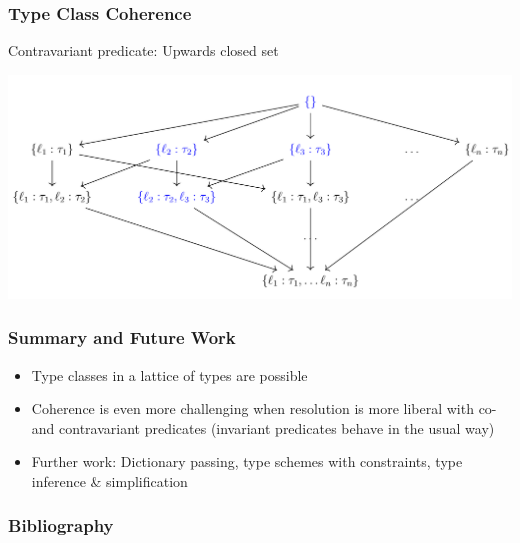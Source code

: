 \documentclass{beamer}
\begin{document}
\begin{frame}
  \frametitle{Type Class Coherence}

  Contravariant predicate: Upwards closed set

  \includegraphics[width=\textwidth]{images/upper_set.png}

  \end{frame}


\begin{frame}
  \frametitle{Summary and Future Work}
  \begin{itemize}
    \item Type classes in a lattice of types are possible
    \item Coherence is even more challenging when resolution is more liberal with co- and contravariant predicates (invariant predicates behave in the usual way)
    \item Further work: Dictionary passing, type schemes with constraints, type inference \& simplification
  \end{itemize}
\end{frame}

\begin{frame}
  \frametitle{Bibliography}
  \footnotesize
  
  
\end{frame}
\end{document}
